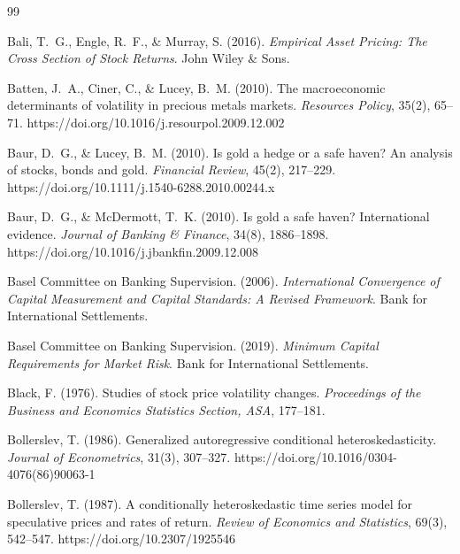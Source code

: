 \documentclass[review,12pt]{elsarticle}
\begin{document}

\begingroup
\singlespacing
\small
\begin{thebibliography}{99}

Bali, T.~G., Engle, R.~F., \& Murray, S. (2016). \textit{Empirical Asset Pricing: The Cross Section of Stock Returns}. John Wiley \& Sons.

Batten, J.~A., Ciner, C., \& Lucey, B.~M. (2010). The macroeconomic determinants of volatility in precious metals markets. \textit{Resources Policy}, 35(2), 65--71. https://doi.org/10.1016/j.resourpol.2009.12.002

Baur, D.~G., \& Lucey, B.~M. (2010). Is gold a hedge or a safe haven? An analysis of stocks, bonds and gold. \textit{Financial Review}, 45(2), 217--229. https://doi.org/10.1111/j.1540-6288.2010.00244.x

Baur, D.~G., \& McDermott, T.~K. (2010). Is gold a safe haven? International evidence. \textit{Journal of Banking \& Finance}, 34(8), 1886--1898. https://doi.org/10.1016/j.jbankfin.2009.12.008

Basel Committee on Banking Supervision. (2006). \textit{International Convergence of Capital Measurement and Capital Standards: A Revised Framework}. Bank for International Settlements.

Basel Committee on Banking Supervision. (2019). \textit{Minimum Capital Requirements for Market Risk}. Bank for International Settlements.

Black, F. (1976). Studies of stock price volatility changes. \textit{Proceedings of the Business and Economics Statistics Section, ASA}, 177--181.

Bollerslev, T. (1986). Generalized autoregressive conditional heteroskedasticity. \textit{Journal of Econometrics}, 31(3), 307--327. https://doi.org/10.1016/0304-4076(86)90063-1

Bollerslev, T. (1987). A conditionally heteroskedastic time series model for speculative prices and rates of return. \textit{Review of Economics and Statistics}, 69(3), 542--547. https://doi.org/10.2307/1925546


\end{thebibliography}
\end{document}
